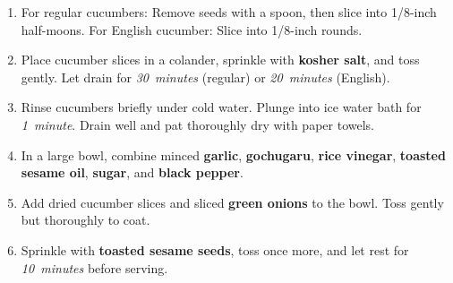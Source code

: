 \documentclass[11pt,letterpaper]{article}
\begin{document}
\begin{enumerate}
    \item For regular cucumbers: Remove seeds with a spoon, then slice into 1/8-inch half-moons. For English cucumber: Slice into 1/8-inch rounds.
    
    \item Place cucumber slices in a colander, sprinkle with \textbf{kosher salt}, and toss gently. Let drain for \textit{30~minutes} (regular) or \textit{20~minutes} (English).
    
    \item Rinse cucumbers briefly under cold water. Plunge into ice water bath for \textit{1~minute}. Drain well and pat thoroughly dry with paper towels.
    
    \item In a large bowl, combine minced \textbf{garlic}, \textbf{gochugaru}, \textbf{rice vinegar}, \textbf{toasted sesame oil}, \textbf{sugar}, and \textbf{black pepper}.
    
    \item Add dried cucumber slices and sliced \textbf{green onions} to the bowl. Toss gently but thoroughly to coat.
    
    \item Sprinkle with \textbf{toasted sesame seeds}, toss once more, and let rest for \textit{10~minutes} before serving.
\end{enumerate}

\newpage
\end{document}
